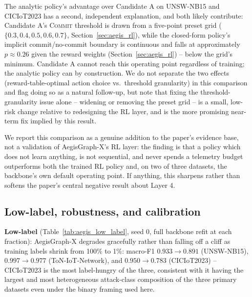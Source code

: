 \documentclass[journal]{IEEEtran}
\begin{document}
The analytic policy's advantage over Candidate A on UNSW-NB15 and CICIoT2023
has a second, independent explanation, and both likely contribute: Candidate
A's \textsc{Commit} threshold is drawn from a five-point preset grid
($\{0.3, 0.4, 0.5, 0.6, 0.7\}$, Section~\ref{sec:aegis_rl}), while the
closed-form policy's implicit commit/no-commit boundary is continuous and
falls at approximately $p \approx 0.26$ given the reward weights
(Section~\ref{sec:aegis_rl}) -- below the grid's minimum. Candidate A cannot
reach this operating point regardless of training; the analytic policy can
by construction. We do not separate the two effects (reward-table-optimal
action choice vs.\ threshold granularity) in this comparison and flag doing
so as a natural follow-up, but note that fixing the threshold-granularity
issue alone -- widening or removing the preset grid -- is a small, low-risk
change relative to redesigning the RL layer, and is the more promising
near-term fix implied by this result.

We report this comparison as a genuine addition to the paper's evidence
base, not a validation of AegisGraph-X's RL layer: the finding is that a
policy which does not learn anything, is not sequential, and never spends a
telemetry budget outperforms both the trained RL policy and, on two of
three datasets, the backbone's own default operating point. If anything,
this sharpens rather than softens the paper's central negative result about
Layer 4.

\subsection{Low-label, robustness, and calibration}
\label{sec:results_lowlabel_robust}



\textbf{Low-label} (Table~\ref{tab:aegis_low_label}, seed 0, full backbone
refit at each fraction): AegisGraph-X degrades gracefully rather than
falling off a cliff as training labels shrink from 100\% to 1\%: macro-F1
$0.933\rightarrow0.891$ (UNSW-NB15), $0.997\rightarrow0.977$
(ToN-IoT-Network), and $0.950\rightarrow0.783$ (CICIoT2023) --
CICIoT2023 is the most label-hungry of the three, consistent with it having
the largest and most heterogeneous attack-class composition of the three
primary datasets even under the binary framing used here.
\end{document}
